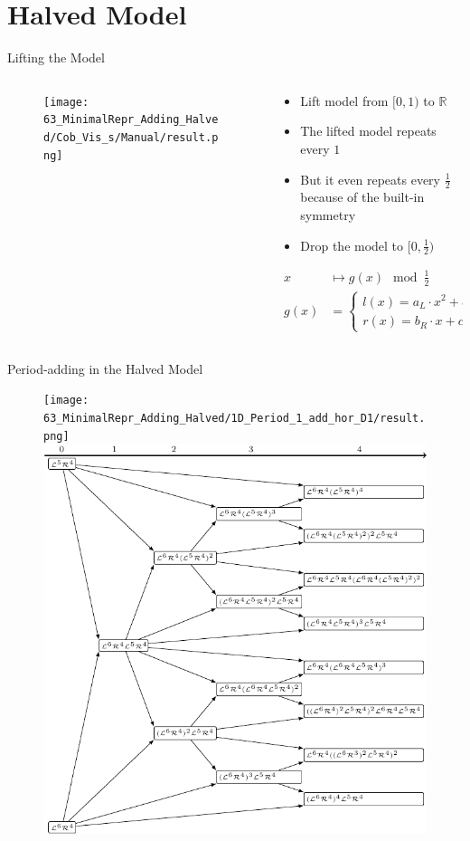 \section{Halved Model}

\begin{frame}{Lifting the Model}
	\vspace{-1em}
	\begin{columns}
		\begin{column}{.4 \textwidth}
			\begin{figure}
				\texttt{[image: 63\_MinimalRepr\_Adding\_Halved/Cob\_Vis\_s/Manual/result.png]}
			\end{figure}
		\end{column}
		\begin{column}{.5 \textwidth}
			\pause
			\begin{itemize}
				\item Lift model from $[0, 1)$ to $\mathbb{R}$ \pause
				\item The lifted model repeats every $1$ \pause
				\item But it even repeats every $\frac{1}{2}$ because of the built-in symmetry \pause
				\item Drop the model to $[0, \frac{1}{2})$ \pause
			\end{itemize}
			\begin{align*}
				x    & \mapsto g(x) \mod \frac{1}{2}                                            \\
				g(x) & = \begin{cases}
					         l(x) = a_L \cdot x^2 + b_L \cdot x + c_L & \text{ if } x < \frac{1}{4} \\
					         r(x) = b_R \cdot x + c_R                 & \text{ else}
				         \end{cases}
			\end{align*}
		\end{column}
	\end{columns}
\end{frame}

\begin{frame}{Period-adding in the Halved Model}
	\begin{figure}
		\texttt{[image: 63\_MinimalRepr\_Adding\_Halved/1D\_Period\_1\_add\_hor\_D1/result.png]}
		\quad
		\includegraphics[width=.4 \textwidth]{../../Report/Figures/FareyTrees/Minrep_Adding1_Halved/adding.pdf}
	\end{figure}
\end{frame}

